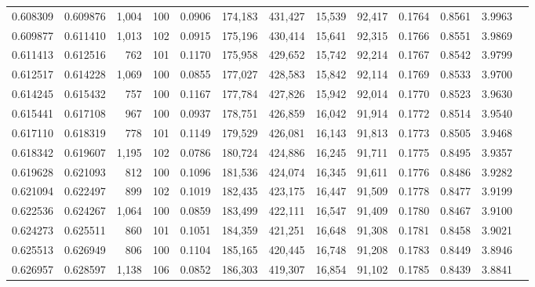 \begin{tabular}{rrrrrrrrrrrrr}
0.608309 & 0.609876 & 1,004 & 100 &                                     0.0906 & 174,183 & 431,427 &  15,539 &  92,417 & 0.1764 & 0.8561 & 3.9963 \\
0.609877 & 0.611410 & 1,013 & 102 &                                     0.0915 & 175,196 & 430,414 &  15,641 &  92,315 & 0.1766 & 0.8551 & 3.9869 \\
0.611413 & 0.612516 &   762 & 101 &                                     0.1170 & 175,958 & 429,652 &  15,742 &  92,214 & 0.1767 & 0.8542 & 3.9799 \\
0.612517 & 0.614228 & 1,069 & 100 &                                     0.0855 & 177,027 & 428,583 &  15,842 &  92,114 & 0.1769 & 0.8533 & 3.9700 \\
0.614245 & 0.615432 &   757 & 100 &                                     0.1167 & 177,784 & 427,826 &  15,942 &  92,014 & 0.1770 & 0.8523 & 3.9630 \\
0.615441 & 0.617108 &   967 & 100 &                                     0.0937 & 178,751 & 426,859 &  16,042 &  91,914 & 0.1772 & 0.8514 & 3.9540 \\
0.617110 & 0.618319 &   778 & 101 &                                     0.1149 & 179,529 & 426,081 &  16,143 &  91,813 & 0.1773 & 0.8505 & 3.9468 \\
0.618342 & 0.619607 & 1,195 & 102 &                                     0.0786 & 180,724 & 424,886 &  16,245 &  91,711 & 0.1775 & 0.8495 & 3.9357 \\
0.619628 & 0.621093 &   812 & 100 &                                     0.1096 & 181,536 & 424,074 &  16,345 &  91,611 & 0.1776 & 0.8486 & 3.9282 \\
0.621094 & 0.622497 &   899 & 102 &                                     0.1019 & 182,435 & 423,175 &  16,447 &  91,509 & 0.1778 & 0.8477 & 3.9199 \\
0.622536 & 0.624267 & 1,064 & 100 &                                     0.0859 & 183,499 & 422,111 &  16,547 &  91,409 & 0.1780 & 0.8467 & 3.9100 \\
0.624273 & 0.625511 &   860 & 101 &                                     0.1051 & 184,359 & 421,251 &  16,648 &  91,308 & 0.1781 & 0.8458 & 3.9021 \\
0.625513 & 0.626949 &   806 & 100 &                                     0.1104 & 185,165 & 420,445 &  16,748 &  91,208 & 0.1783 & 0.8449 & 3.8946 \\
0.626957 & 0.628597 & 1,138 & 106 &                                     0.0852 & 186,303 & 419,307 &  16,854 &  91,102 & 0.1785 & 0.8439 & 3.8841 \\

\end{tabular}
